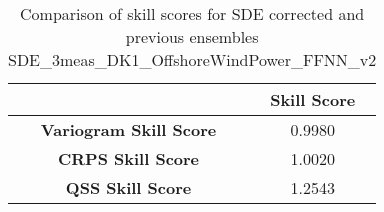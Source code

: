 
        \begin{table}[h!]
            \centering
            \begin{tabular}{|c|c|}
                \hline
                & \textbf{Skill Score}  \\
                \hline
                \textbf{Variogram Skill Score} & 0.9980  \\
                \hline
                \textbf{CRPS Skill Score} & 1.0020  \\
                \hline
                \textbf{QSS Skill Score} & 1.2543 \\
                \hline
            \end{tabular}
            \caption{Comparison of skill scores for SDE corrected and previous ensembles SDE_3meas_DK1_OffshoreWindPower_FFNN_v2}
            \label{table:skill_scores_comparison}
        \end{table}
        